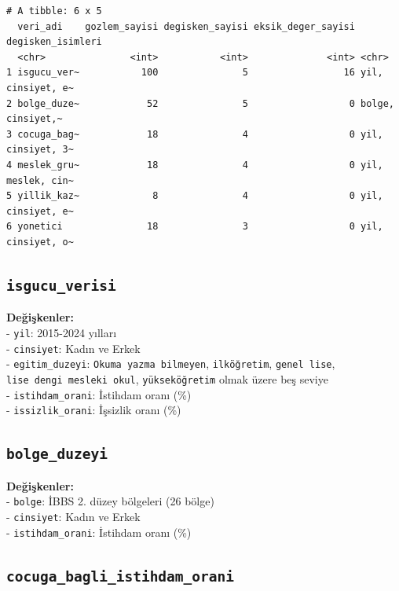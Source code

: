 \documentclass[
  11pt,
  a4paper,
  DIV=11,
  numbers=noendperiod]{scrartcl}
\begin{document}
\begin{verbatim}
# A tibble: 6 x 5
  veri_adi    gozlem_sayisi degisken_sayisi eksik_deger_sayisi degisken_isimleri
  <chr>               <int>           <int>              <int> <chr>            
1 isgucu_ver~           100               5                 16 yil, cinsiyet, e~
2 bolge_duze~            52               5                  0 bolge, cinsiyet,~
3 cocuga_bag~            18               4                  0 yil, cinsiyet, 3~
4 meslek_gru~            18               4                  0 yil, meslek, cin~
5 yillik_kaz~             8               4                  0 yil, cinsiyet, e~
6 yonetici               18               3                  0 yil, cinsiyet, o~
\end{verbatim}

\subsection{\texorpdfstring{\texttt{isgucu\_verisi}}{isgucu\_verisi}}\label{isgucu_verisi}

\textbf{Değişkenler:}\\
- \texttt{yil}: 2015-2024 yılları\\
- \texttt{cinsiyet}: Kadın ve Erkek\\
- \texttt{egitim\_duzeyi}: \texttt{Okuma\ yazma\ bilmeyen},
\texttt{ilköğretim}, \texttt{genel\ lise},
\texttt{lise\ dengi\ mesleki\ okul}, \texttt{yükseköğretim} olmak üzere
beş seviye\\
- \texttt{istihdam\_orani}: İstihdam oranı (\%)\\
- \texttt{issizlik\_orani}: İşsizlik oranı (\%)

\subsection{\texorpdfstring{\texttt{bolge\_duzeyi}}{bolge\_duzeyi}}\label{bolge_duzeyi}

\textbf{Değişkenler:}\\
- \texttt{bolge}: İBBS 2. düzey bölgeleri (26 bölge)\\
- \texttt{cinsiyet}: Kadın ve Erkek\\
- \texttt{istihdam\_orani}: İstihdam oranı (\%)

\subsection{\texorpdfstring{\texttt{cocuga\_bagli\_istihdam\_orani}}{cocuga\_bagli\_istihdam\_orani}}\label{cocuga_bagli_istihdam_orani}
\end{document}
